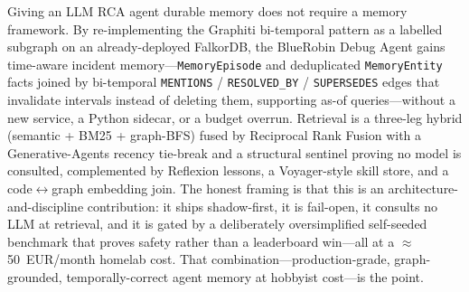 \documentclass[11pt]{article}
\begin{document}
Giving an LLM RCA agent durable memory does not require a memory framework. By
re-implementing the Graphiti bi-temporal pattern as a labelled subgraph on an
already-deployed FalkorDB, the BlueRobin Debug Agent gains time-aware incident
memory---\texttt{MemoryEpisode} and deduplicated \texttt{MemoryEntity} facts
joined by bi-temporal \texttt{MENTIONS} / \texttt{RESOLVED\_BY} /
\texttt{SUPERSEDES} edges that invalidate intervals instead of deleting them,
supporting as-of queries---without a new service, a Python sidecar, or a budget
overrun. Retrieval is a three-leg hybrid (semantic + BM25 + graph-BFS) fused by
Reciprocal Rank Fusion with a Generative-Agents recency tie-break and a structural
sentinel proving no model is consulted, complemented by Reflexion lessons, a
Voyager-style skill store, and a code$\leftrightarrow$graph embedding join. The
honest framing is that this is an architecture-and-discipline contribution: it
ships shadow-first, it is fail-open, it consults no LLM at retrieval, and it is
gated by a deliberately oversimplified self-seeded benchmark that proves safety
rather than a leaderboard win---all at a $\approx$50~EUR/month homelab cost. That
combination---production-grade, graph-grounded, temporally-correct agent memory at
hobbyist cost---is the point.



\end{document}
